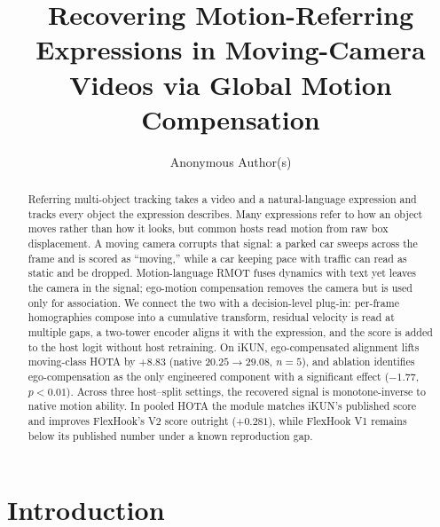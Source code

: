 \documentclass[sigconf,review,anonymous]{acmart}
\begin{document}
\title{Recovering Motion-Referring Expressions in Moving-Camera Videos via Global Motion Compensation}

\author{Anonymous Author(s)}

\begin{abstract}
Referring multi-object tracking takes a video and a natural-language expression and tracks every object the expression describes. Many expressions refer to how an object moves rather than how it looks, but common hosts read motion from raw box displacement. A moving camera corrupts that signal: a parked car sweeps across the frame and is scored as ``moving,'' while a car keeping pace with traffic can read as static and be dropped. Motion-language RMOT fuses dynamics with text yet leaves the camera in the signal; ego-motion compensation removes the camera but is used only for association. We connect the two with a decision-level plug-in: per-frame homographies compose into a cumulative transform, residual velocity is read at multiple gaps, a two-tower encoder aligns it with the expression, and the score is added to the host logit without host retraining. On iKUN, ego-compensated alignment lifts moving-class HOTA by $+8.83$ (native $20.25\!\to\!29.08$, $n{=}5$), and ablation identifies ego-compensation as the only engineered component with a significant effect ($-1.77$, $p{<}0.01$). Across three host--split settings, the recovered signal is monotone-inverse to native motion ability. In pooled HOTA the module matches iKUN's published score and improves FlexHook's V2 score outright ($+0.281$), while FlexHook V1 remains below its published number under a known reproduction gap.
\end{abstract}


\maketitle

\section{Introduction}
\label{sec:intro}
\end{document}
